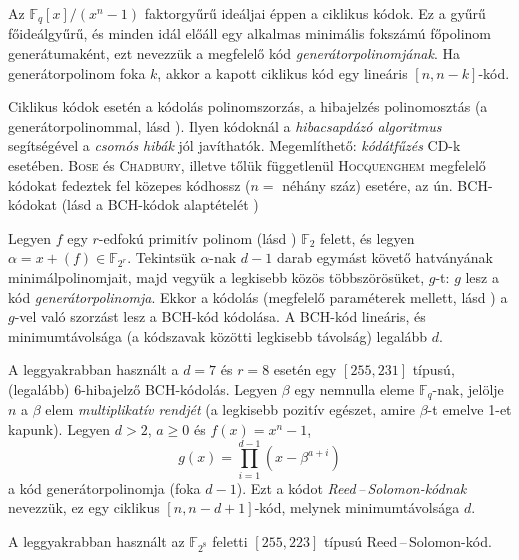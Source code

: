 \documentclass[DIV=15,appendixprefix]{scrreprt}
\theoremstyle{definition}
\theoremstyle{remark}
\begin{document}
Az $ \mathbb{ F }_{ q } \left[ x \right] / \left( x^{ n } - 1 \right) $ faktorgyűrű ideáljai éppen a
ciklikus kódok. Ez a gyűrű főideálgyűrű, és minden idál előáll egy alkalmas minimális fokszámú
főpolinom generátumaként, ezt nevezzük a megfelelő kód \emph{generátorpolinomjának}. Ha
generátorpolinom foka $ k $, akkor a kapott ciklikus kód egy lineáris $ \left[ n,{} n - k
\right] $-kód.

Ciklikus kódok esetén a kódolás polinomszorzás, a hibajelzés polinomosztás (a generátorpolinommal,
lásd \cite[39.~oldal]{Czedli}). Ilyen kódoknál a \emph{hibacsapdázó algoritmus} segítségével a
\emph{csomós hibák} jól javíthatók. Megemlíthető: \emph{kódátfűzés} CD-k esetében.
%
\textsc{Bose} és \textsc{Chadbury}, illetve tőlük függetlenül \textsc{Hocquenghem} megfelelő
kódokat fedeztek fel közepes kódhossz ($ n = $ néhány száz) esetére, az ún. BCH-kódokat (lásd a
BCH-kódok alaptételét \cite[3.6.~tétel, 36.~oldal]{Czedli})

Legyen $ f $ egy $ r $-edfokú primitív polinom (lásd \cite[35.~oldal]{Czedli})
$ \mathbb{ F }_{ 2 } $ felett, és legyen $ \alpha =
x + \left( f \right) \in \mathbb{ F }_{ 2^{ r } } $. Tekintsük $ \alpha $-nak $ d - 1 $ darab
egymást követő hatványának minimálpolinomjait, majd vegyük a legkisebb közös többszörösüket,
$ g $-t: $ g $ lesz a kód \emph{generátorpolinomja}. Ekkor a kódolás (megfelelő paraméterek mellett,
lásd \cite[3.7.~definíció, 38.~oldal]{Czedli}) a $ g $-vel való szorzást lesz a BCH-kód kódolása. A
BCH-kód lineáris, és minimumtávolsága (a kódszavak közötti legkisebb távolság) legalább $ d $.

A leggyakrabban használt a $ d = 7 $ és $ r = 8 $ esetén egy $ \left[ 255,{} 231 \right] $ típusú,
(legalább) $ 6 $-hibajelző BCH-kódolás.
%
Legyen $ \beta $ egy nemnulla eleme $ \mathbb{ F }_{ q } $-nak, jelölje $ n $ a $ \beta $ elem
\emph{multiplikatív rendjét} (a legkisebb pozitív egészet, amire $ \beta $-t emelve 1-et kapunk).
Legyen $ d > 2 $, $ a \ge 0 $ és $ f \left( x \right) = x^{ n } - 1 $,
\begin{equation*}
	g \left( x \right) = \prod_{ i = 1 }^{ d - 1 } \left( x - \beta^{ a + i } \right)
\end{equation*}
a kód generátorpolinomja (foka $ d - 1 $). Ezt a kódot \emph{Reed\,--\,Solomon-kódnak} nevezzük, ez
egy ciklikus $ \left[ n,{} n - d + 1 \right] $-kód, melynek minimumtávolsága $ d $.

A leggyakrabban használt az $ \mathbb{ F }_{ 2^{ 8 } } $ feletti $ \left[ 255, 223 \right] $ típusú
Reed\,--\,Solomon-kód.
%
\end{document}
